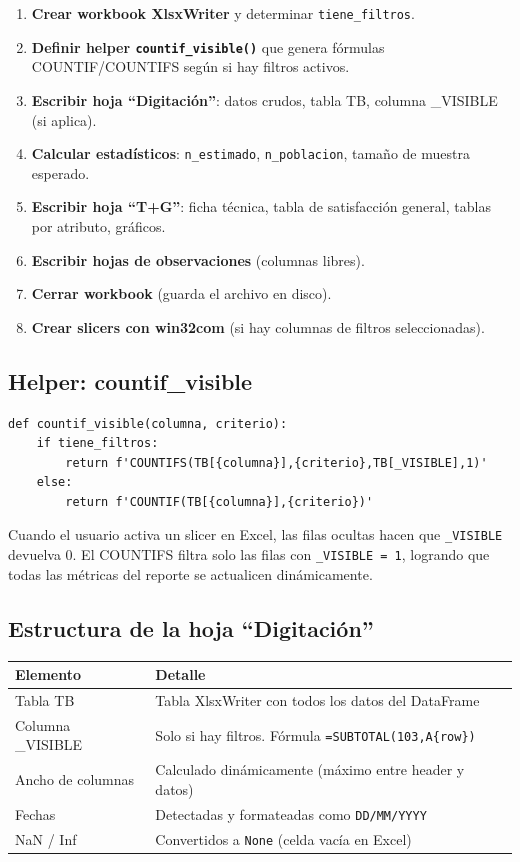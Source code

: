 \documentclass[12pt, letterpaper]{article}
\begin{document}
\begin{enumerate}[leftmargin=1.5cm, label=\textbf{\arabic*.}]
  \item \textbf{Crear workbook XlsxWriter} y determinar \texttt{tiene\_filtros}.
  \item \textbf{Definir helper \texttt{countif\_visible()}} que genera fórmulas COUNTIF/COUNTIFS según si hay filtros activos.
  \item \textbf{Escribir hoja ``Digitación''}: datos crudos, tabla TB, columna \_VISIBLE (si aplica).
  \item \textbf{Calcular estadísticos}: \texttt{n\_estimado}, \texttt{n\_poblacion}, tamaño de muestra esperado.
  \item \textbf{Escribir hoja ``T+G''}: ficha técnica, tabla de satisfacción general, tablas por atributo, gráficos.
  \item \textbf{Escribir hojas de observaciones} (columnas libres).
  \item \textbf{Cerrar workbook} (guarda el archivo en disco).
  \item \textbf{Crear slicers con win32com} (si hay columnas de filtros seleccionadas).
\end{enumerate}

\subsection{Helper: countif\_visible}

\begin{lstlisting}[caption={Función helper para fórmulas con soporte de filtros}]
def countif_visible(columna, criterio):
    if tiene_filtros:
        return f'COUNTIFS(TB[{columna}],{criterio},TB[_VISIBLE],1)'
    else:
        return f'COUNTIF(TB[{columna}],{criterio})'
\end{lstlisting}

Cuando el usuario activa un slicer en Excel, las filas ocultas hacen que \texttt{\_VISIBLE} devuelva 0. El COUNTIFS filtra solo las filas con \texttt{\_VISIBLE = 1}, logrando que todas las métricas del reporte se actualicen dinámicamente.

\subsection{Estructura de la hoja ``Digitación''}

\begin{center}
\begin{tabular}{l l}
\toprule
\textbf{Elemento} & \textbf{Detalle} \\
\midrule
Tabla TB & Tabla XlsxWriter con todos los datos del DataFrame \\
Columna \_VISIBLE & Solo si hay filtros. Fórmula \texttt{=SUBTOTAL(103,A\{row\})} \\
Ancho de columnas & Calculado dinámicamente (máximo entre header y datos) \\
Fechas & Detectadas y formateadas como \texttt{DD/MM/YYYY} \\
NaN / Inf & Convertidos a \texttt{None} (celda vacía en Excel) \\
\bottomrule
\end{tabular}
\end{center}
\end{document}
